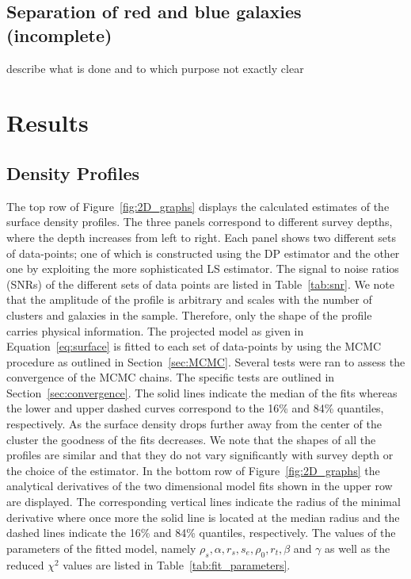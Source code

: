 \documentclass[a4paper,fleqn,usenatbib]{mnras}
\begin{document}
\subsection{Separation of red and blue galaxies (incomplete)}
\label{sec:Color}
describe what is done and to which purpose
not exactly clear

\section{Results}
\subsection{Density Profiles}

The top row of Figure~\ref{fig:2D_graphs} displays the calculated estimates of the surface density profiles. The three panels correspond to different survey depths, where the depth increases from left to right. Each panel shows two different sets of data-points; one of which is constructed using the DP estimator and the other one by exploiting the more sophisticated LS estimator. The signal to noise ratios (SNRs) of the different sets of data points are listed in Table~\ref{tab:snr}. We note that the amplitude of the profile is arbitrary and scales with the number of clusters and galaxies in the sample. Therefore, only the shape of the profile carries physical information. The projected model as given in Equation~\ref{eq:surface} is fitted to each set of data-points by using the MCMC procedure as outlined in Section~\ref{sec:MCMC}. Several tests were ran to assess the convergence of the MCMC chains. The specific tests are outlined in Section~\ref{sec:convergence}. The solid lines indicate the median of the fits whereas the lower and upper dashed curves correspond to the 16\% and 84\% quantiles, respectively. As the surface density drops further away from the center of the cluster the goodness of the fits decreases. We note that the shapes of all the profiles are similar and that they do not vary significantly with survey depth or the choice of the estimator. In the bottom row of Figure~\ref{fig:2D_graphs} the analytical derivatives of the two dimensional model fits shown in the upper row are displayed. The corresponding vertical lines indicate the radius of the minimal derivative where once more the solid line is located at the median radius and the dashed lines indicate the 16\% and 84\% quantiles, respectively. The values of the parameters of the fitted model, namely $\rho_s, \alpha, r_s, s_e, \rho_0, r_t, \beta$ and $\gamma$ as well as the reduced $\chi^2$ values are listed in Table~\ref{tab:fit_parameters}.
\end{document}
